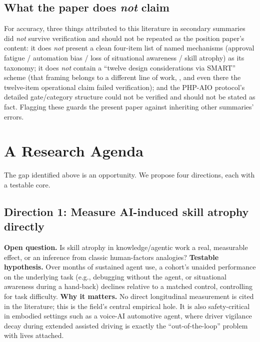 \documentclass[11pt]{article}
\begin{document}
\subsection{What the paper does \emph{not} claim}

For accuracy, three things attributed to this literature in secondary summaries did
\emph{not} survive verification and should not be repeated as the position paper's content:
it does \emph{not} present a clean four-item list of named mechanisms (approval fatigue /
automation bias / loss of situational awareness / skill atrophy) as its taxonomy; it does
\emph{not} contain a ``twelve design considerations via SMART'' scheme (that framing belongs
to a different line of work, \citet{faas2025}, and even there the twelve-item operational
claim failed verification); and the PHP-AIO protocol's detailed gate/category structure
\citep{delachica2026} could not be verified and should not be stated as fact. Flagging these
guards the present paper against inheriting other summaries' errors.

\section{A Research Agenda}
\label{sec:agenda}

The gap identified above is an opportunity. We propose four directions, each with a
testable core.

\subsection{Direction 1: Measure AI-induced skill atrophy directly}

\textbf{Open question.} Is skill atrophy in knowledge/agentic work a real, measurable
effect, or an inference from classic human-factors analogies?
\textbf{Testable hypothesis.} Over months of sustained agent use, a cohort's unaided
performance on the underlying task (e.g., debugging without the agent, or situational
awareness during a hand-back) declines relative to a matched control, controlling for task
difficulty. \textbf{Why it matters.} No direct longitudinal measurement is cited in the
literature; this is the field's central empirical hole. It is also safety-critical in
embodied settings such as a voice-AI automotive agent, where driver vigilance decay during
extended assisted driving is exactly the ``out-of-the-loop'' problem with lives attached.
\end{document}
